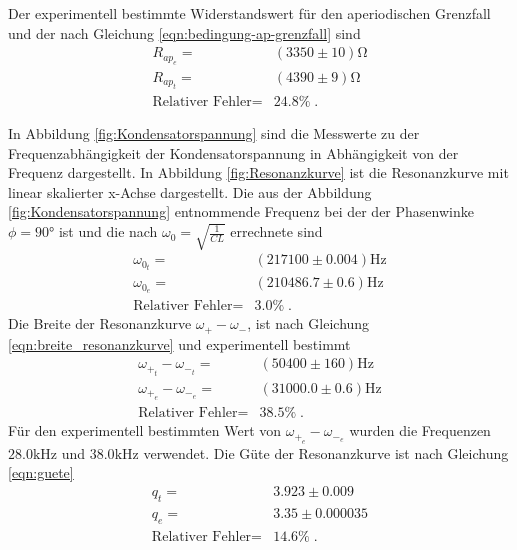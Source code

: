 Der experimentell bestimmte Widerstandswert für den aperiodischen Grenzfall
und  der nach Gleichung \eqref{eqn:bedingung-ap-grenzfall} sind
\begin{align*}
  R_{ap_e}=&(3350\pm10)\si{\ohm}\\
  R_{ap_t}=&(4390\pm9)\si{\ohm}\\
  \text{Relativer Fehler}=&24.8\%\;.
\end{align*}


In Abbildung \ref{fig:Kondensatorspannung} sind die
Messwerte zu der Frequenzabhängigkeit der Kondensatorspannung in Abhängigkeit
von der Frequenz dargestellt. In Abbildung \ref{fig:Resonanzkurve} ist die
Resonanzkurve mit linear skalierter x-Achse dargestellt. Die aus der Abbildung
\ref{fig:Kondensatorspannung}
entnommende Frequenz bei der der Phasenwinke $\phi=90°$ ist und die
nach $\omega_0=\sqrt{\frac{1}{CL}}$ errechnete sind
\begin{align*}
\omega_{0_t}=&(217100\pm0.004)\si{\hertz}\\
\omega_{0_e}=&(210486.7\pm0.6)\si{\hertz}\\
\text{Relativer Fehler}=&3.0\%\;.
\end{align*}
 Die Breite der
Resonanzkurve $\omega_+-\omega_- $, ist nach Gleichung \eqref{eqn:breite_resonanzkurve}
 und experimentell bestimmt
\begin{align*}
 \omega_{+_t}-\omega_{-_t}=&(50400\pm160)\si{\hertz}\\
 \omega_{+_e}-\omega_{-_e}=&(31000.0\pm0.6)\si{\hertz}\\
 \text{Relativer Fehler}=&38.5\%\;.
\end{align*}
Für den experimentell bestimmten Wert von $\omega_{+_e}-\omega_{-_e}$ wurden
die Frequenzen $28.0\si{\kilo\hertz}$ und $38.0\si{\kilo\hertz}$ verwendet.
Die Güte der Resonanzkurve ist nach Gleichung \eqref{eqn:guete}
\begin{align*}
  q_t=&3.923\pm0.009\\
  q_e=&3.35\pm0.000035\\
  \text{Relativer Fehler}=&14.6\%\;.
\end{align*}
